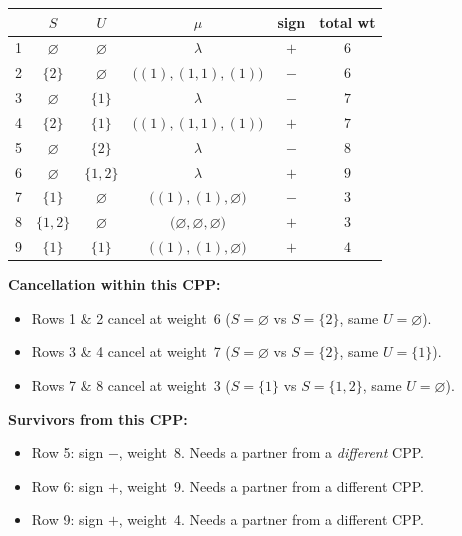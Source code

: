 \documentclass[11pt]{article}
\begin{document}
\medskip
\begin{center}
\renewcommand{\arraystretch}{1.2}
\begin{tabular}{c|c|c|c|c|c}
  & $S$ & $U$ & $\mu$ & sign & total wt \\ \hline
1 & $\varnothing$ & $\varnothing$ & $\lambda$ & $+$ & $6$ \\
2 & $\{2\}$ & $\varnothing$ &
  $\bigl((1),(1\!,\!1),(1)\bigr)$ & $-$ & $6$ \\[3pt] \hline
3 & $\varnothing$ & $\{1\}$ & $\lambda$ & $-$ & $7$ \\
4 & $\{2\}$ & $\{1\}$ &
  $\bigl((1),(1\!,\!1),(1)\bigr)$ & $+$ & $7$ \\[3pt] \hline
5 & $\varnothing$ & $\{2\}$ & $\lambda$ & $-$ & $8$ \\[3pt] \hline
6 & $\varnothing$ & $\{1,2\}$ & $\lambda$ & $+$ & $9$ \\[3pt]
  \hline\hline
7 & $\{1\}$ & $\varnothing$ &
  $\bigl((1),(1),\varnothing\bigr)$ & $-$ & $3$ \\
8 & $\{1,2\}$ & $\varnothing$ &
  $\bigl(\varnothing,\varnothing,\varnothing\bigr)$ & $+$ & $3$
  \\[3pt] \hline
9 & $\{1\}$ & $\{1\}$ &
  $\bigl((1),(1),\varnothing\bigr)$ & $+$ & $4$ \\
\end{tabular}
\end{center}

\medskip\noindent
\textbf{Cancellation within this CPP:}
\begin{itemize}
  \item Rows 1 \& 2 cancel at weight~6
    ($S = \varnothing$ vs $S = \{2\}$, same $U = \varnothing$).
  \item Rows 3 \& 4 cancel at weight~7
    ($S = \varnothing$ vs $S = \{2\}$, same $U = \{1\}$).
  \item Rows 7 \& 8 cancel at weight~3
    ($S = \{1\}$ vs $S = \{1,2\}$, same $U = \varnothing$).
\end{itemize}

\noindent
\textbf{Survivors from this CPP:}
\begin{itemize}
  \item Row 5: sign $-$, weight~8.
    Needs a partner from a \emph{different} CPP.
  \item Row 6: sign $+$, weight~9.
    Needs a partner from a different CPP.
  \item Row 9: sign $+$, weight~4.
    Needs a partner from a different CPP.
\end{itemize}
\end{document}

